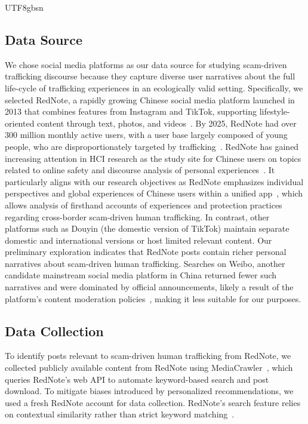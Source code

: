 \documentclass[sigconf,nonacm]{acmart}
\newcommand{\rev}[1]{#1}
\begin{document}
\begin{CJK}{UTF8}{gbsn}
\subsection{Data Source}

We chose social media platforms as our data source for studying scam-driven trafficking discourse because they capture diverse user narratives about the full life-cycle of trafficking experiences in an ecologically valid setting. Specifically, we selected RedNote, a rapidly growing Chinese social media platform launched in 2013 that combines features from Instagram and TikTok, supporting lifestyle-oriented content through text, photos, and videos~\cite{sun2023influence, huang2024domesticating}. By 2025, RedNote had over 300 million monthly active users, with a user base largely composed of young people\rev{, who are disproportionately targeted by trafficking~\cite{scmpAlibabaTeams, walby2016study}. RedNote has gained increasing attention in HCI research as the study site for Chinese users on topics related to online safety and discourse analysis of personal experiences~\cite{wan-chi25, deng-deng25,li2025challenges, he2025living}. It particularly aligns with our research objectives as RedNote emphasizes individual perspectives and global experiences of Chinese users within a unified app~\cite{ying_acceptance_2023}, which allows analysis of firsthand accounts of experiences and protection practices regarding cross-border scam-driven human trafficking. In contrast, other platforms such as Douyin (the domestic version of TikTok) maintain separate domestic and international versions or host limited relevant content. Our preliminary exploration indicates that RedNote posts contain richer personal narratives about scam-driven human trafficking. Searches on Weibo, another candidate mainstream social media platform in China returned fewer such narratives and were dominated by official announcements, likely a result of the platform's content moderation policies~\cite{zhu2012tracking, Zhu-sec13}, making it less suitable for our purposes.}

\subsection{Data Collection}

To identify posts relevant to scam-driven human trafficking from RedNote, we collected publicly available content from RedNote using MediaCrawler~\cite{nanmicoder2025mediacrawler}, which queries RedNote's web API to automate keyword-based search and post download. To mitigate biases introduced by personalized recommendations, we used a fresh RedNote account for data collection. RedNote's search feature relies on contextual similarity rather than strict keyword matching~\cite{deng-deng25}.


\end{CJK}
\end{document}
